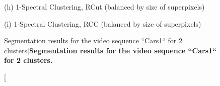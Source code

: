 \begin{figure}[ht!]
\begin{minipage}[t]{1\textwidth}
\footnotesize (h) 1-Spectral Clustering, RCut (balanced by size of superpixels)
\end{minipage}
\begin{minipage}[t]{1\textwidth}
\centering
\hfill \hfill  \hfill
\hfill
{}
\hfill
{}
\hfill
{}
\hfill \hfill  \hfill

\footnotesize (i) 1-Spectral Clustering, RCC (balanced by size of superpixels)
\end{minipage}
 \caption[Segmentation results for the video sequence ``Cars1`` for 2 clusters]{
  {\bf Segmentation results for the video sequence ``Cars1`` for 2 clusters.}}
\label{fig:seg_res_C1}
\end{figure}
